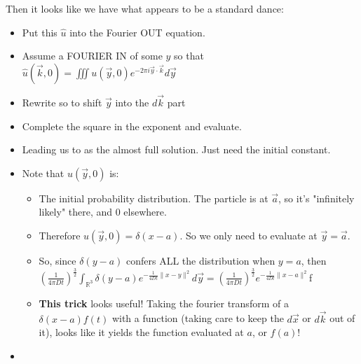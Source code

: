 \documentclass[11pt, oneside]{article}   	%
\begin{document}
Then it looks like we have what appears to be a standard dance:
\begin{itemize}
\item Put this $\hat{u}$ into the Fourier OUT equation.
\item Assume a FOURIER IN of some $y$ so that  $\hat{u}(\vec{k}, 0) = \iiint u(\vec{y}, 0)e^{-2\pi i \vec{y} \cdot \vec{k}} d\vec{y}$
\item Rewrite so to shift $\vec{y}$ into the $d\vec{k}$ part
\item Complete the square in the exponent and evaluate.
\item Leading us to  as the almost full solution.  Just need the initial constant.
\item Note that $u(\vec{y}, 0)$ is:
\begin{itemize}
\item The initial probability distribution.  The particle is at $\vec{a}$, so it's "infinitely likely" there, and 0 elsewhere.
\item Therefore $u(\vec{y}, 0) = \delta(x-a)$.  So we only need to evaluate at $\vec{y} = \vec{a}$.
\item So, since $\delta(y-a)$ confers ALL the distribution when $y=a$, then $(\frac{1}{4 \pi D t})^{\frac{3}{2}} \int_{\mathbb{R}^3}\delta(y-a)e^{-\frac{1}{4 Dt} \| x - y\|^2}d\vec{y} = (\frac{1}{4 \pi D t})^{\frac{3}{2}} e^{-\frac{1}{4 Dt} \| x - a\|^2}$f
\item \textbf{This trick} looks useful!  Taking the fourier transform of a $\delta(x-a)f(t)$ with a function (taking care to keep the $d\vec{x}$ or $d\vec{k}$ out of it), looks like it yields the function evaluated at $a$, or $f(a)$!
\end{itemize}
\item 
\end{itemize}
\end{document}
